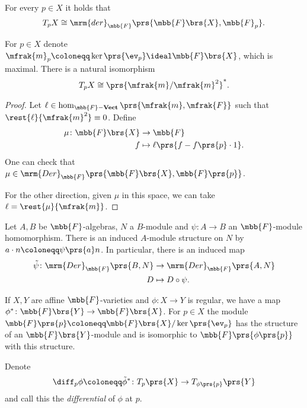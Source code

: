 \documentclass[10pt,a4paper,twoside,openany,hidelinks]{book}
\begin{document}
\begin{corollary}
For every $p \in X$ it holds that
\begin{align*}
T_p X \cong \mrm{der}_{\mbb{F}}\prs{\mbb{F}\brs{X}, \mbb{F}_p} \text{.}
\end{align*}
\end{corollary}

\begin{proposition}
For $p \in X$ denote $\mfrak{m}_p \coloneqq \ker\prs{\ev_p} \ideal \mbb{F}\brs{X}$, which is maximal.
There is a natural isomorphism
\[T_p X \cong \prs{\mfrak{m}/\mfrak{m}^2}^* \text{.}\]
\end{proposition}


\begin{proof}
Let $\ell \in \hom_{\mbb{F}\mathbf{-Vect}}\prs{\mfrak{m}, \mfrak{F}}$ such that $\rest{\ell}{\mfrak{m}^2} \equiv 0$.
Define
\begin{align*}
\mu \colon \mbb{F}\brs{X} &\to \mbb{F} \\
f &\mapsto \ell\prs{f-f\prs{p}\cdot 1} \text{.}
\end{align*}
One can check that $\mu \in \mrm{Der}_{\mbb{F}}\prs{\mbb{F}\brs{X}, \mbb{F}\prs{p}}$.

For the other direction, given $\mu$ in this space, we can take $\ell = \rest{\mu}{\mfrak{m}}$.
\end{proof}

Let $A,B$ be $\mbb{F}$-algebras, $N$ a $B$-module and $\psi \colon A \to B$ an $\mbb{F}$-module homomorphism.
There is an induced $A$-module structure on $N$ by $a \cdot n \coloneqq \psi\prs{a} n$.
In particular, there is an induced map
\begin{align*}
\tilde{\psi} \colon \mrm{Der}_{\mbb{F}}\prs{B,N} &\to \mrm{Der}_{\mbb{F}}\prs{A,N} \\
D &\mapsto D \circ \psi \text{.}
\end{align*}

If $X,Y$ are affine $\mbb{F}$-varieties and $\phi \colon X \to Y$ is regular, we have a map $\phi^* \colon \mbb{F}\brs{Y} \to \mbb{F}\brs{X}$.
For $p \in X$ the module $\mbb{F}\prs{p} \coloneqq \mbb{F}\brs{X}/\ker\prs{\ev_p}$ has the structure of an $\mbb{F}\brs{Y}$-module and is isomorphic to $\mbb{F}\prs{\phi\prs{p}}$ with this structure.

\begin{definition}
Denote
\begin{align*}
\diff_p \phi \coloneqq \tilde{\phi}^* \colon T_p\prs{X} \to T_{\phi\prs{p}}\prs{Y}
\end{align*}
and call this the \emph{differential} of $\phi$ at $p$.
\end{definition}
\end{document}
